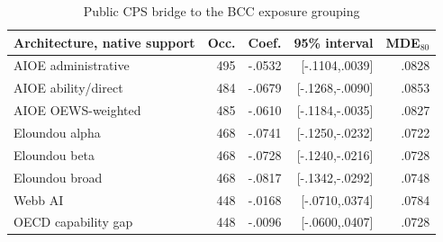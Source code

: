 \begin{table}[htbp]
\centering
\caption{Public CPS bridge to the BCC exposure grouping}\label{tab:appbcc}
\scriptsize
\begin{tabularx}{\textwidth}{Yrrrr}
\toprule
Architecture, native support & Occ. & Coef. & 95\% interval & MDE$_{80}$ \\
\midrule
AIOE administrative & 495 & -.0532 & [-.1104,.0039] & .0828 \\
AIOE ability/direct & 484 & -.0679 & [-.1268,-.0090] & .0853 \\
AIOE OEWS-weighted & 485 & -.0610 & [-.1184,-.0035] & .0827 \\
Eloundou alpha & 468 & -.0741 & [-.1250,-.0232] & .0722 \\
Eloundou beta & 468 & -.0728 & [-.1240,-.0216] & .0728 \\
Eloundou broad & 468 & -.0817 & [-.1342,-.0292] & .0748 \\
Webb AI & 448 & -.0168 & [-.0710,.0374] & .0784 \\
OECD capability gap & 448 & -.0096 & [-.0600,.0407] & .0728 \\
\bottomrule
\end{tabularx}
\end{table}
\FloatBarrier

